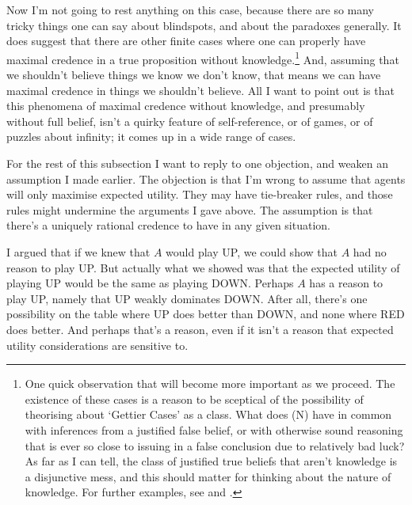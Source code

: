\documentclass[11pt,]{book}
\let\rmarkdownfootnote\footnote%
\def\footnote{\protect\rmarkdownfootnote}
\begin{document}
Now I'm not going to rest anything on this case, because there are so many tricky things one can say about blindspots, and about the paradoxes generally. It does suggest that there are other finite cases where one can properly have maximal credence in a true proposition without knowledge.\footnote{One quick observation that will become more important as we proceed. The existence of these cases is a reason to be sceptical of the possibility of theorising about `Gettier Cases' as a class. What does (N) have in common with inferences from a justified false belief, or with otherwise sound reasoning that is ever so close to issuing in a false conclusion due to relatively bad luck? As far as I can tell, the class of justified true beliefs that aren't knowledge is a disjunctive mess, and this should matter for thinking about the nature of knowledge. For further examples, see \citet{Williamson2013-WILGCI} and \citet{Nagel2013-Williamson}.} And, assuming that we shouldn't believe things we know we don't know, that means we can have maximal credence in things we shouldn't believe. All I want to point out is that this phenomena of maximal credence without knowledge, and presumably without full belief, isn't a quirky feature of self-reference, or of games, or of puzzles about infinity; it comes up in a wide range of cases.

For the rest of this subsection I want to reply to one objection, and weaken an assumption I made earlier. The objection is that I'm wrong to assume that agents will only maximise expected utility. They may have tie-breaker rules, and those rules might undermine the arguments I gave above. The assumption is that there's a uniquely rational credence to have in any given situation.

I argued that if we knew that \(A\) would play UP, we could show that \(A\) had no reason to play UP. But actually what we showed was that the expected utility of playing UP would be the same as playing DOWN. Perhaps \(A\) has a reason to play UP, namely that UP weakly dominates DOWN. After all, there's one possibility on the table where UP does better than DOWN, and none where RED does better. And perhaps that's a reason, even if it isn't a reason that expected utility considerations are sensitive to.
\end{document}
